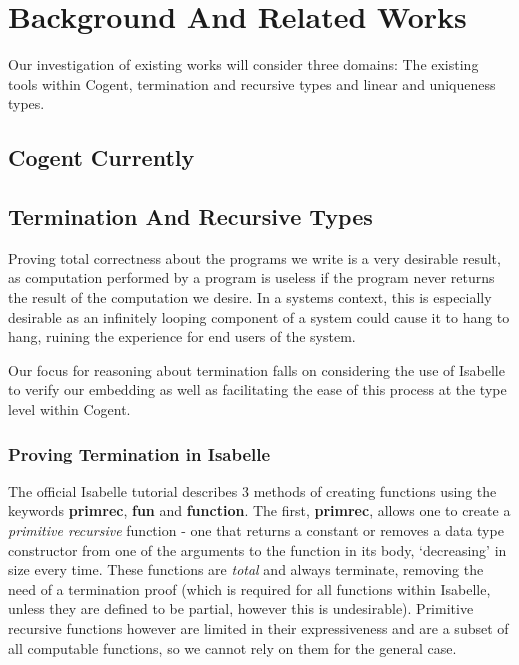 \chapter{Background And Related Works}\label{ch:background}
Our investigation of existing works will consider three domains: The existing tools within Cogent,
termination and recursive types and linear and uniqueness types.

\section{Cogent Currently}

\section{Termination And Recursive Types}

Proving total correctness about the programs we write is a very desirable result,
as computation performed by a program is useless if the program never returns the
result of the computation we desire.
In a systems context, this is especially desirable as an infinitely looping component of a
system could cause it to hang to hang, ruining the experience for end users of the system.

Our focus for reasoning about termination falls on considering the use of Isabelle to verify our 
embedding as well as facilitating the ease of this process at the type level within Cogent. 

\subsection{Proving Termination in Isabelle}


The official Isabelle tutorial\citep{IsabelleTutorial} describes 3 methods of creating functions using the keywords 
\textbf{primrec}, \textbf{fun} and \textbf{function}. The first, \textbf{primrec}, allows one to create a 
\textit{primitive recursive} function - one that returns a constant or removes a data type constructor from one
of the arguments to the function in its body, `decreasing' in size every time. These functions are \textit{total}
and always terminate, removing the need of a termination proof (which is required for all functions within Isabelle,
unless they are defined to be partial, however this is undesirable).
Primitive recursive functions however are limited in their expressiveness and are a subset of all computable
functions, so we cannot rely on them for the general case.

